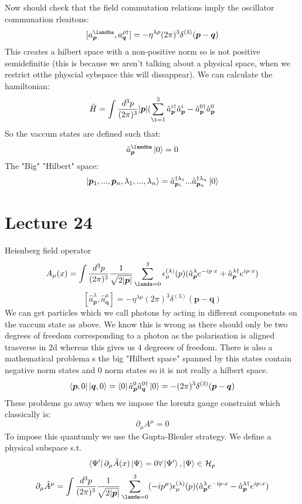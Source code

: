 \documentclass[12pt, a4paper, twoside, titlepage]{article}
\begin{document}
\begin{pmartix}
$$$$
Now should check that the field commutation relations imply the oscillator communation rleaitons:
$$
[a^{\lamdba}_{\bm p}, a^{\rho \dagger}_{\bm q} ] = - \eta^{\lambda \rho}(2 \pi )^3 \delta^{(3)} (\bm p - \bm q)
$$
This creates a hilbert space with a non-positive norm so is not positive semidefinitie (this is because we aren't talking about a physical space, when we restrict otthe physcial sybspace this will dissappear). We can calculate the hamiltonian:
$$
\hat H = \int \frac{d^3 p}{(2\pi)^3} |\bm p| (\sum _{\i=1}^3 \hat a^{i \dagger}_{\bm p} \hat a^i_{\bm p} - \hat a^{0 \dagger}_{\bm p} \hat a^0_{\bm p}
$$
So the vaccum states are defined such that:
$$
\hat a^{\lamdba}_{\bm p} \ket{0} = 0
$$
The "Big" "Hilbert" space:
$$
\ket{\bm p_1, ..., \bm p_n, \lambda_1,..., \lambda_n} = \hat a^{\dagger \lambda_1}_{\bm p_1}...\hat a^{\dagger \lambda_n}_{\bm p_n} \ket{0}
$$\section{Lecture 24}
Heisnberg field operator
$$
A_{\mu} (x) = \int \frac{d^3 p}{(2\pi)^3} \frac{1}{\sqrt{2|\bm p|}} \sum_{\lamda=0}^3 \epsilon^{(\lambda)}_{\mu} (p) (\hat a_{\bm p}^{\lambda} e^{-i p \cdot x} + \hat a_{\bm p}^{\lambda \dagger} e^{i p \cdot x})
$$
$$
[\hat a_{\bm p}^{\lambda}, \hat a^{\mu}_{\bm q}] = - \eta^{\lambda \mu} (2\pi)^3 \delta^{(3)}(\bm p - \bm q)
$$
We can get particles which we call photons by acting in different componetnts on the vaccum state as above. We know this is wrong as there should only be two degrees of freedom corresponding to a photon as the polarisation is aligned trasverse in 2d whereas this gives us 4 degreees of freedom. There is also a mathematical problema s the big "Hilbert space" spanned by this states contain negative norm states and 0 norm states so it is not really a hilbert space.
$$
\bra{\bm p, 0} \ket{\bm q, 0} = \bra{0} \hat a_{\bm p}^0 \hat a^{0 \dagger}_{\bm q} \ket{0} = -(2 \pi)^3 \delta^{(3)}(\bm p - \bm q)
$$
These problems go away when we impose the lorentz gauge constraint which classically is:
$$
\partial_{\mu} A^{\mu} = 0 $$
To impose this quantumly we use the Gupta-Bleuler strategy. We define a physical subspace s.t.
$$
\bra{\Psi'} \partial_{\mu} \hat A(x) \ket{\Psi} = 0 \forall \ket{\Psi'}, \ket{\Psi} \in \mathcal{H}_p
$$
$$
\partial_{\mu}\hat A^{\mu} = \int \frac{d^3 p}{(2\pi)^3} \frac{1}{\sqrt{2|\bm p|}} \sum_{\lamda=0}^3 (-i p^{\mu})\epsilon^{(\lambda)}_{\mu} (p) (\hat a_{\bm p}^{\lambda} e^{-i p \cdot x} - \hat a_{\bm p}^{\lambda \dagger} e^{i p \cdot x})
$$

\end{pmartix}
\end{document}
